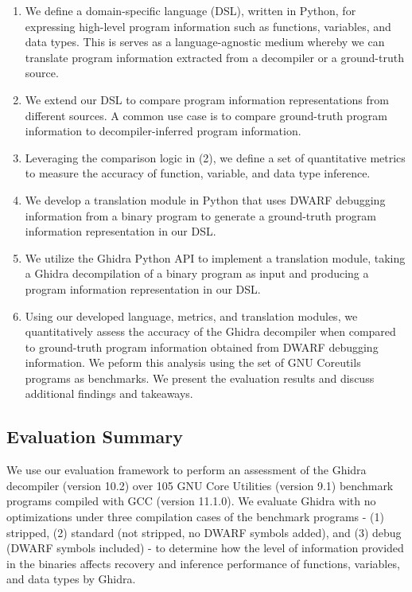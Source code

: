 \documentclass[conference]{IEEEtran}
\begin{document}
\begin{enumerate}
    \item We define a domain-specific language (DSL), written in Python, for expressing high-level program information such as functions, variables, and data types. This is serves as a language-agnostic medium whereby we can translate program information extracted from a decompiler or a ground-truth source.
    \item We extend our DSL to compare program information representations from different sources. A common use case is to compare ground-truth program information to decompiler-inferred program information.
    \item Leveraging the comparison logic in (2), we define a set of quantitative metrics to measure the accuracy of function, variable, and data type inference.
    \item We develop a translation module in Python that uses DWARF debugging information from a binary program to generate a ground-truth program information representation in our DSL.
    \item We utilize the Ghidra Python API to implement a translation module, taking a Ghidra decompilation of a binary program as input and producing a program information representation in our DSL.
    \item Using our developed language, metrics, and translation modules, we quantitatively assess the accuracy of the Ghidra decompiler when compared to ground-truth program information obtained from DWARF debugging information. We peform this analysis using the set of GNU Coreutils programs as benchmarks. We present the evaluation results and discuss additional findings and takeaways.
\end{enumerate}

\subsection{Evaluation Summary}

We use our evaluation framework to perform an assessment of the Ghidra decompiler (version 10.2) over 105 GNU Core Utilities (version 9.1) benchmark programs compiled with GCC (version 11.1.0). We evaluate Ghidra with no optimizations under three compilation cases of the benchmark programs - (1) stripped, (2) standard (not stripped, no DWARF symbols added), and (3) debug (DWARF symbols included) - to determine how the level of information provided in the binaries affects recovery and inference performance of functions, variables, and data types by Ghidra.
\end{document}
